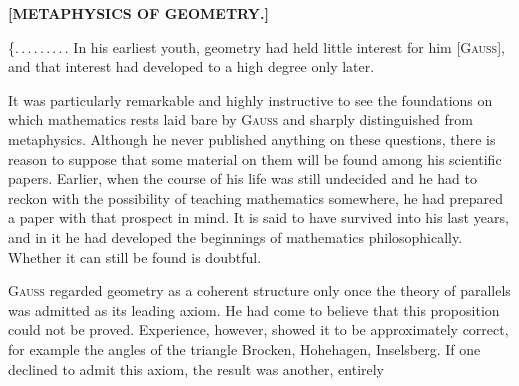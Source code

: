 \clearpage
{}%
\begin{center}
\textbf{[METAPHYSICS OF GEOMETRY.]}

\end{center}

\{\mbox{.\,.\,.\,.\,.\,.\,.\,.\,.} In his earliest youth, geometry had held little interest for him [\textsc{Gauss}], and that interest had developed to a high degree only later.

It was particularly remarkable and highly instructive to see the foundations on which mathematics rests laid bare by \textsc{Gauss} and sharply distinguished from metaphysics. Although he never published anything on these questions, there is reason to suppose that some material on them will be found among his scientific papers. Earlier, when the course of his life was still undecided and he had to reckon with the possibility of teaching mathematics somewhere, he had prepared a paper with that prospect in mind. It is said to have survived into his last years, and in it he had developed the beginnings of mathematics philosophically. Whether it can still be found is doubtful.

\textsc{Gauss} regarded geometry as a coherent structure only once the theory of parallels was admitted as its leading axiom. He had come to believe that this proposition could not be proved. Experience, however, showed it to be approximately correct, for example the angles of the triangle Brocken, Hohehagen, Inselsberg. If one declined to admit this axiom, the result was another, entirely\space%
